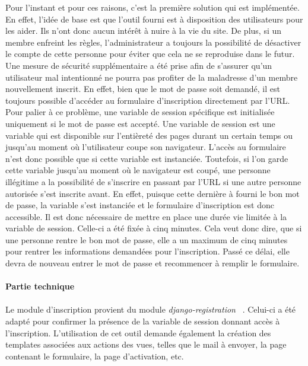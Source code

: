 \documentclass[12pt, a4paper, oneside]{article}
\begin{document}
    \indent Pour l'instant et pour ces raisons, c'est la première solution qui est implémentée. En effet, l'idée de base est que l'outil fourni est à disposition des utilisateurs pour les aider. Ils n'ont donc aucun intérêt à nuire à la vie du site. De plus, si un membre enfreint les règles, l'administrateur a toujours la possibilité de désactiver le compte de cette personne pour éviter que cela ne se reproduise dans le futur. Une mesure de sécurité supplémentaire a été prise afin de s'assurer qu'un utilisateur mal intentionné ne pourra pas profiter de la maladresse d'un membre nouvellement inscrit. En effet, bien que le mot de passe soit demandé, il est toujours possible d'accéder au formulaire d'inscription directement par l'URL. Pour palier à ce problème, une variable de session spécifique est initialisée uniquement si le mot de passe est accepté. Une variable de session est une variable qui est disponible sur l'entièreté des pages durant un certain temps ou jusqu'au moment où l'utilisateur coupe son navigateur. L'accès au formulaire n'est donc possible que si cette variable est instanciée. Toutefois, si l'on garde cette variable jusqu'au moment où le navigateur est coupé, une personne illégitime a la possibilité de s'inscrire en passant par l'URL si une autre personne autorisée s'est inscrite avant. En effet, puisque cette dernière à fourni le bon mot de passe, la variable s'est instanciée et le formulaire d'inscription est donc accessible. Il est donc nécessaire de mettre en place une durée vie limitée à la variable de session. Celle-ci a été fixée à cinq minutes. Cela veut donc dire, que si une personne rentre le bon mot de passe, elle a un maximum de cinq minutes pour rentrer les informations demandées pour l'inscription. Passé ce délai, elle devra de nouveau entrer le mot de passe et recommencer à remplir le formulaire.\\\\
\textbf{Partie technique}\\\\
    \indent Le module d'inscription provient du module \textit{django-registration} ~\cite{django-registration}. Celui-ci a été adapté pour confirmer la présence de la variable de session donnant accès à l'inscription. L'utilisation de cet outil demande également la création des templates associées aux actions des vues, telles que le mail à envoyer, la page contenant le formulaire, la page d'activation, etc.\\
\end{document}
